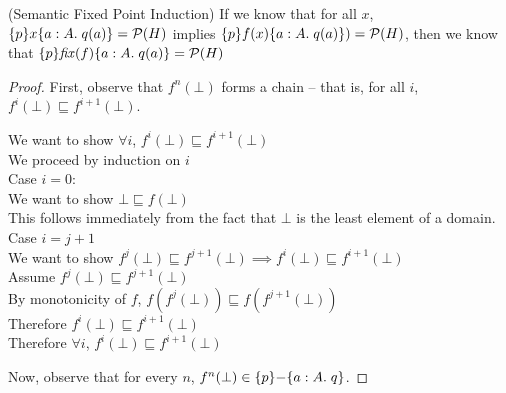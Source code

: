 \begin{lemma}{(Semantic Fixed Point Induction)}
If we know that for all $x$, $\{{p}\}{x}\{{a:A}.\;{q(a)}\} = \mathcal{P}(H)$ implies $\{{p}\}{f(x)}\{{a:A}.\;{q(a)}\}) = \mathcal{P}(H)$, then we know that $\{{p}\}{\mathit{fix}(f)}\{{a:A}.\;{q(a)}\} = \mathcal{P}(H)$
\end{lemma}

\begin{proof}
First, observe that $f^n(\bot)$ forms a chain -- that is, for all $i$, $f^i(\bot) \sqsubseteq f^{i+1}(\bot)$.
\begin{tabbedproof}
\oo We want to show $\forall i$, $f^i(\bot) \sqsubseteq f^{i+1}(\bot)$ \\
\oo We proceed by induction on $i$ \\
\ooo Case $i = 0$: \\
\oooo We want to show $\bot \sqsubseteq f(\bot)$ \\
\oooo This follows immediately from the fact that $\bot$ is the least element of a domain. \\
\ooo Case $i = j + 1$ \\
\oooo We want to show $f^j(\bot) \sqsubseteq f^{j+1}(\bot) \implies f^i(\bot) \sqsubseteq f^{i+1}(\bot)$ \\
\oooo Assume $f^j(\bot) \sqsubseteq f^{j+1}(\bot)$ \\
\ooooo By monotonicity of $f$, $f(f^j(\bot)) \sqsubseteq f(f^{j+1}(\bot))$ \\
\ooooo Therefore $f^i(\bot) \sqsubseteq f^{i+1}(\bot)$ \\
\oo Therefore $\forall i$, $f^i(\bot) \sqsubseteq f^{i+1}(\bot)$ \\
\end{tabbedproof}

\noindent Now, observe that for every $n$, $f^n(\bot) \in \{{p}\}{-}\{{a:A}.\;{q}\}$. 


\end{proof}
